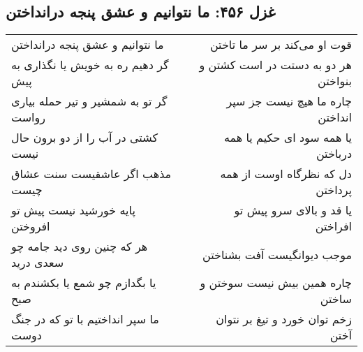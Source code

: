 \begin{center}
\section*{غزل ۴۵۶: ما نتوانیم و عشق پنجه درانداختن}
\label{sec:456}
\begin{longtable}{l p{0.5cm} r}
ما نتوانیم و عشق پنجه درانداختن
&&
قوت او می‌کند بر سر ما تاختن
\\
گر دهیم ره به خویش یا نگذاری به پیش
&&
هر دو به دستت در است کشتن و بنواختن
\\
گر تو به شمشیر و تیر حمله بیاری رواست
&&
چاره ما هیچ نیست جز سپر انداختن
\\
کشتی در آب را از دو برون حال نیست
&&
یا همه سود ای حکیم یا همه درباختن
\\
مذهب اگر عاشقیست سنت عشاق چیست
&&
دل که نظرگاه اوست از همه پرداختن
\\
پایه خورشید نیست پیش تو افروختن
&&
یا قد و بالای سرو پیش تو افراختن
\\
هر که چنین روی دید جامه چو سعدی درید
&&
موجب دیوانگیست آفت بشناختن
\\
یا بگدازم چو شمع یا بکشندم به صبح
&&
چاره همین بیش نیست سوختن و ساختن
\\
ما سپر انداختیم با تو که در جنگ دوست
&&
زخم توان خورد و تیغ بر نتوان آختن
\\
\end{longtable}
\end{center}
